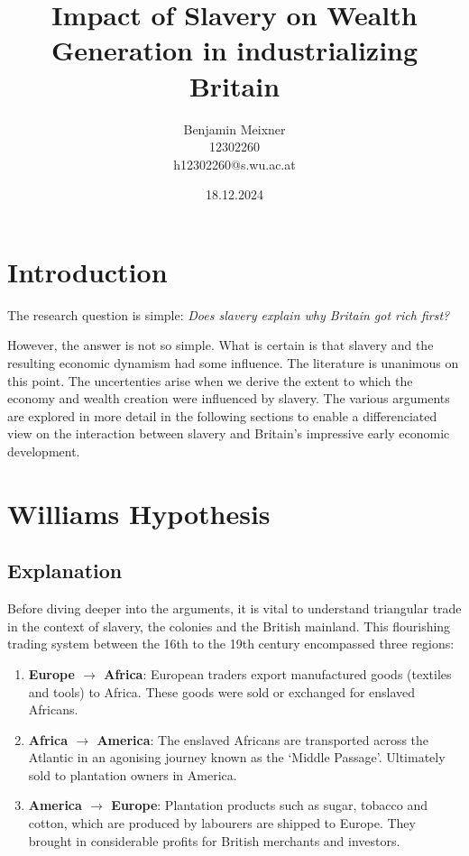 \documentclass[a4paper,11pt]{article}
\begin{document}
\title{Impact of Slavery on Wealth Generation in industrializing Britain}
\author{Benjamin Meixner \\ 12302260 \\ h12302260@s.wu.ac.at}
\date{18.12.2024} %
\maketitle

\pagebreak

\tableofcontents

\pagebreak

\section*{Introduction}

The research question is simple: \qquad \textit{Does slavery explain why Britain got rich first?}

However, the answer is not so simple. What is certain is that slavery and the resulting economic dynamism had some influence. The literature is unanimous on this point. The uncertenties arise when we derive the extent to which the economy and wealth creation were influenced by slavery. The various arguments are explored in more detail in the following sections to enable a differenciated view on the interaction between slavery and Britain's impressive early economic development.

\section{Williams Hypothesis}
\subsection{Explanation}

Before diving deeper into the arguments, it is vital to understand triangular trade in the context of slavery, the colonies and the British mainland. This flourishing trading system between the 16th to the 19th century encompassed three regions:

\begin{enumerate}
    \itemsep0em
    \item \textbf{Europe $\rightarrow$ Africa}: European traders export manufactured goods (textiles and tools) to Africa. These goods were sold or exchanged for enslaved Africans.

    \item \textbf{Africa $\rightarrow$ America}: The enslaved Africans are transported across the Atlantic in an agonising journey known as the ‘Middle Passage’. Ultimately sold to plantation owners in America.

    \item \textbf{America $\rightarrow$ Europe}: Plantation products such as sugar, tobacco and cotton, which are produced by labourers are shipped to Europe. They brought in considerable profits for British merchants and investors.
\end{enumerate}
\end{document}
